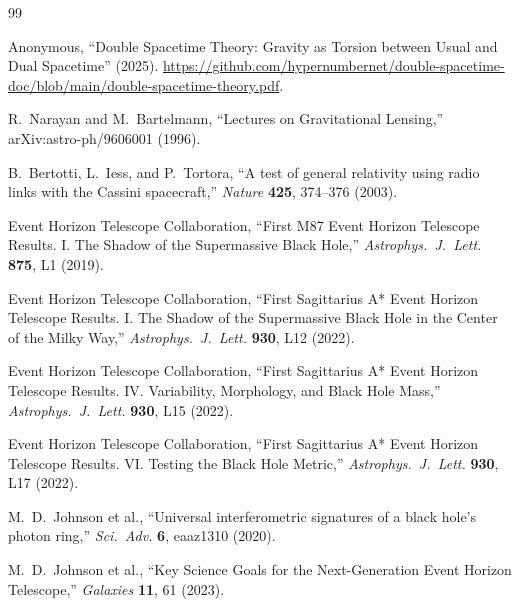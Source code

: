 \documentclass[a4paper]{article}
\begin{document}
\begin{thebibliography}{99}
\raggedright

Anonymous,
``Double Spacetime Theory: Gravity as Torsion between Usual and Dual Spacetime'' (2025).
\url{https://github.com/hypernumbernet/double-spacetime-doc/blob/main/double-spacetime-theory.pdf}.

R.~Narayan and M.~Bartelmann,
``Lectures on Gravitational Lensing,''
arXiv:astro-ph/9606001 (1996).

B.~Bertotti, L.~Iess, and P.~Tortora,
``A test of general relativity using radio links with the Cassini spacecraft,''
\textit{Nature} \textbf{425}, 374--376 (2003).

Event Horizon Telescope Collaboration,
``First M87 Event Horizon Telescope Results. I. The Shadow of the Supermassive Black Hole,''
\textit{Astrophys.\ J.\ Lett.} \textbf{875}, L1 (2019).

Event Horizon Telescope Collaboration,
``First Sagittarius A* Event Horizon Telescope Results. I. The Shadow of the Supermassive Black Hole in the Center of the Milky Way,''
\textit{Astrophys.\ J.\ Lett.} \textbf{930}, L12 (2022).

Event Horizon Telescope Collaboration,
``First Sagittarius A* Event Horizon Telescope Results. IV. Variability, Morphology, and Black Hole Mass,''
\textit{Astrophys.\ J.\ Lett.} \textbf{930}, L15 (2022).

Event Horizon Telescope Collaboration,
``First Sagittarius A* Event Horizon Telescope Results. VI. Testing the Black Hole Metric,''
\textit{Astrophys.\ J.\ Lett.} \textbf{930}, L17 (2022).

M.~D.~Johnson et al.,
``Universal interferometric signatures of a black hole's photon ring,''
\textit{Sci.\ Adv.} \textbf{6}, eaaz1310 (2020).

M.~D.~Johnson et al.,
``Key Science Goals for the Next-Generation Event Horizon Telescope,''
\textit{Galaxies} \textbf{11}, 61 (2023).

\end{thebibliography}
\end{document}
